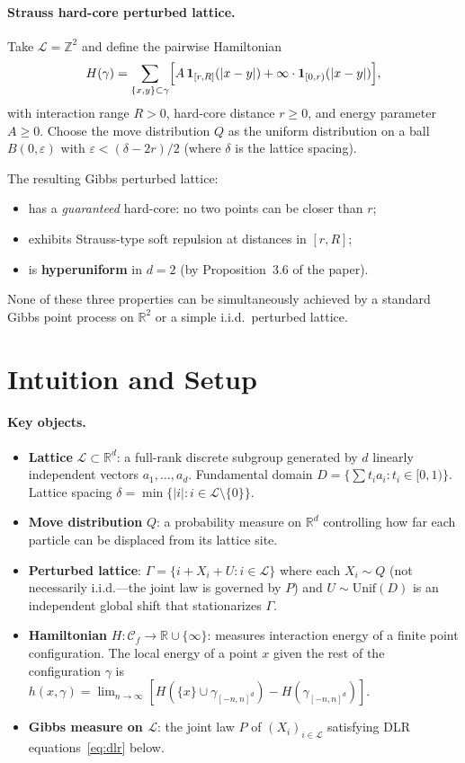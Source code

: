 \documentclass[11pt,a4paper]{article}
\begin{document}
\paragraph{Strauss hard-core perturbed lattice.}
Take $\mathcal{L}=\mathbb{Z}^2$ and define the pairwise Hamiltonian
\[
  H(\gamma)=\sum_{\{x,y\}\subset\gamma}\Bigl[A\,\mathbf{1}_{[r,R]}(|x-y|) + \infty\cdot\mathbf{1}_{[0,r)}(|x-y|)\Bigr],
\]
with interaction range $R>0$, hard-core distance $r\ge 0$, and energy parameter $A\ge 0$.
Choose the move distribution $Q$ as the uniform distribution on a ball $B(0,\varepsilon)$ with $\varepsilon<(\delta-2r)/2$ (where $\delta$ is the lattice spacing).

\smallskip\noindent
The resulting Gibbs perturbed lattice:
\begin{itemize}[nosep]
  \item has a \emph{guaranteed} hard-core: no two points can be closer than $r$;
  \item exhibits Strauss-type soft repulsion at distances in $[r,R]$;
  \item is \textbf{hyperuniform} in $d=2$ (by Proposition~3.6 of the paper).
\end{itemize}
None of these three properties can be simultaneously achieved by a standard Gibbs point process on $\mathbb{R}^2$ or a simple i.i.d.\ perturbed lattice.

\section{Intuition and Setup}

\paragraph{Key objects.}
\begin{itemize}[nosep]
  \item \textbf{Lattice} $\mathcal{L}\subset\mathbb{R}^d$: a full-rank discrete subgroup generated by $d$ linearly independent vectors $a_1,\dots,a_d$.  Fundamental domain $D=\bigl\{\sum t_i a_i : t_i\in[0,1)\bigr\}$.  Lattice spacing $\delta=\min\{|i|:i\in\mathcal{L}\setminus\{0\}\}$.
  \item \textbf{Move distribution} $Q$: a probability measure on $\mathbb{R}^d$ controlling how far each particle can be displaced from its lattice site.
  \item \textbf{Perturbed lattice}: $\Gamma=\{i+X_i+U:i\in\mathcal{L}\}$ where each $X_i\sim Q$ (not necessarily i.i.d.---the joint law is governed by $P$) and $U\sim\mathrm{Unif}(D)$ is an independent global shift that stationarizes $\Gamma$.
  \item \textbf{Hamiltonian} $H:\mathcal{C}_f\to\mathbb{R}\cup\{\infty\}$: measures interaction energy of a finite point configuration.  The local energy of a point $x$ given the rest of the configuration $\gamma$ is $h(x,\gamma)=\lim_{n\to\infty}[H(\{x\}\cup\gamma_{[-n,n]^d})-H(\gamma_{[-n,n]^d})]$.
  \item \textbf{Gibbs measure on $\mathcal{L}$}: the joint law $P$ of $(X_i)_{i\in\mathcal{L}}$ satisfying DLR equations~\eqref{eq:dlr} below.
\end{itemize}
\end{document}
